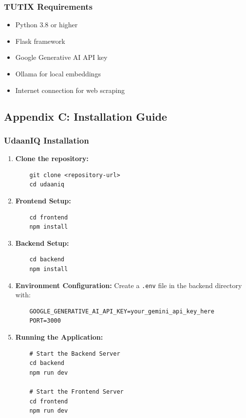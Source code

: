 \documentclass[12pt, conference]{IEEEtran}
\begin{document}
\subsubsection*{TUTIX Requirements}
\begin{itemize}
    \item Python 3.8 or higher
    \item Flask framework
    \item Google Generative AI API key
    \item Ollama for local embeddings
    \item Internet connection for web scraping
\end{itemize}

\subsection*{Appendix C: Installation Guide}

\subsubsection*{UdaanIQ Installation}
\begin{enumerate}
    \item \textbf{Clone the repository:}
    \begin{verbatim}
    git clone <repository-url>
    cd udaaniq
    \end{verbatim}

    \item \textbf{Frontend Setup:}
    \begin{verbatim}
    cd frontend
    npm install
    \end{verbatim}

    \item \textbf{Backend Setup:}
    \begin{verbatim}
    cd backend
    npm install
    \end{verbatim}

    \item \textbf{Environment Configuration:}
    Create a \texttt{.env} file in the backend directory with:
    \begin{verbatim}
    GOOGLE_GENERATIVE_AI_API_KEY=your_gemini_api_key_here
    PORT=3000
    \end{verbatim}

    \item \textbf{Running the Application:}
    \begin{verbatim}
    # Start the Backend Server
    cd backend
    npm run dev
    
    # Start the Frontend Server
    cd frontend
    npm run dev
    \end{verbatim}
\end{enumerate}
\end{document}
